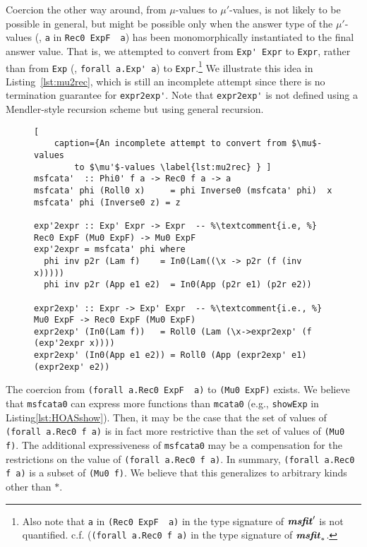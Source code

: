 Coercion the other way around, from $\mu$-values to $\mu'$-values,
is not likely to be possible in general, but might be possible
only when the answer type of the $\mu'$-values (\eg, \lstinline{a}
in \lstinline{Rec0 ExpF  a}) has been monomorphically instantiated
to the final answer value. That is, we attempted to convert from
\lstinline{Exp' Expr} to \lstinline{Expr}, rather than from \lstinline{Exp}
(\ie, \lstinline{forall a.Exp' a}) to \lstinline{Expr}.\footnote{
	Also note that \lstinline{a} in \lstinline{(Rec0 ExpF  a)}
	in the type signature of $\textbf{\textit{msfit}}_{}'$
	is not quantified. {c.f.} (\lstinline{(forall a.Rec0 f a)}
	in the type signature of $\textbf{\textit{msfit}}_{*}$.}
We illustrate this idea in Listing~\ref{lst:mu2rec}, which is still
an incomplete attempt since there is no termination guarantee for
\lstinline{expr2exp'}. Note that \lstinline{expr2exp'} is not defined
using a Mendler-style recursion scheme but using general recursion.

\begin{figure}
\begin{lstlisting}[
	caption={An incomplete attempt to convert from $\mu$-values
		to $\mu'$-values \label{lst:mu2rec} } ]
msfcata'  :: Phi0' f a -> Rec0 f a -> a
msfcata' phi (Roll0 x)     = phi Inverse0 (msfcata' phi)  x
msfcata' phi (Inverse0 z) = z

exp'2expr :: Exp' Expr -> Expr  -- %\textcomment{i.e, %} Rec0 ExpF (Mu0 ExpF) -> Mu0 ExpF
exp'2expr = msfcata' phi where
  phi inv p2r (Lam f)    = In0(Lam((\x -> p2r (f (inv x)))))
  phi inv p2r (App e1 e2)  = In0(App (p2r e1) (p2r e2))

expr2exp' :: Expr -> Exp' Expr  -- %\textcomment{i.e., %} Mu0 ExpF -> Rec0 ExpF (Mu0 ExpF)
expr2exp' (In0(Lam f))   = Roll0 (Lam (\x->expr2exp' (f (exp'2expr x))))
expr2exp' (In0(App e1 e2)) = Roll0 (App (expr2exp' e1) (expr2exp' e2))
\end{lstlisting}
\vspace*{-3ex}
\end{figure}

The coercion from \lstinline{(forall a.Rec0 ExpF  a)}
to \lstinline{(Mu0 ExpF)} exists. We believe that \lstinline{msfcata0} can
express more functions than \lstinline{mcata0} (e.g., \lstinline{showExp}
in Listing\;\ref{lst:HOASshow}). Then, it may be the case that the set of
values of \lstinline{(forall a.Rec0 f a)} is in fact more restrictive than
the set of values of \lstinline{(Mu0 f)}. The additional expressiveness of
\lstinline{msfcata0} may be a compensation for the restrictions on
the value of \lstinline{(forall a.Rec0 f a)}. In summary, 
\lstinline{(forall a.Rec0 f a)} is a subset of \lstinline{(Mu0 f)}.
We believe that this generalizes to arbitrary kinds other than $*$.


